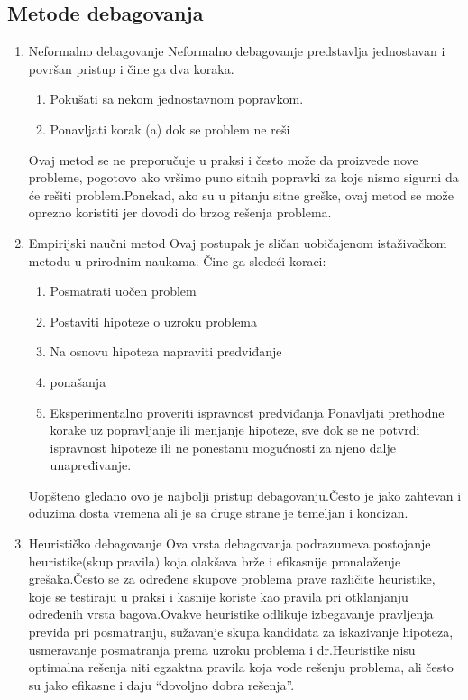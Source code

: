 \documentclass[a4paper]{article}
\begin{document}
\subsection{Metode debagovanja}
\label{subsec:podnaslov2}

\begin{enumerate}
	\item Neformalno debagovanje
	Neformalno debagovanje predstavlja jednostavan i površan pristup i čine ga dva koraka.
	\begin{enumerate}
		\item Pokušati sa nekom jednostavnom popravkom.
		\item Ponavljati korak (a) dok se problem ne reši
	\end{enumerate}
	Ovaj metod se ne preporučuje u praksi i često može da proizvede nove probleme, pogotovo ako vršimo puno sitnih popravki za koje nismo sigurni da će rešiti problem.Ponekad, ako su u pitanju sitne greške, ovaj metod se može oprezno koristiti jer dovodi do brzog rešenja problema.\cite{debagovanje_vladaf}
	
	\item Empirijski naučni metod
	Ovaj postupak je sličan uobičajenom istaživačkom metodu u prirodnim naukama.
	Čine ga sledeći koraci:
	\begin{enumerate}
		\item Posmatrati uočen problem
		\item Postaviti hipoteze o uzroku problema
		\item Na osnovu hipoteza napraviti predviđanje \item ponašanja
		\item Eksperimentalno proveriti ispravnost predviđanja
		Ponavljati prethodne korake uz popravljanje ili menjanje hipoteze, sve dok se ne potvrdi ispravnost hipoteze ili ne ponestanu mogućnosti za njeno dalje unapređivanje.
	\end{enumerate}
	\indent Uopšteno gledano ovo je najbolji pristup debagovanju.Često je jako zahtevan i oduzima dosta vremena ali je sa druge strane je temeljan i koncizan.\cite{debagovanje_vladaf}
	
	
	\item Heurističko debagovanje
	Ova vrsta debagovanja podrazumeva postojanje heuristike(skup pravila) koja olakšava brže i efikasnije pronalaženje grešaka.Često se za određene skupove problema prave različite heuristike, koje se testiraju u praksi i kasnije koriste kao pravila pri otklanjanju određenih vrsta bagova.Ovakve heuristike odlikuje izbegavanje pravljenja previda pri posmatranju, sužavanje skupa kandidata za iskazivanje hipoteza, usmeravanje posmatranja prema uzroku problema i dr.Heuristike nisu optimalna rešenja niti egzaktna pravila koja vode rešenju problema, ali često su jako efikasne i daju “dovoljno dobra rešenja”.\cite{debagovanje_vladaf}
\end{enumerate}
\end{document}
